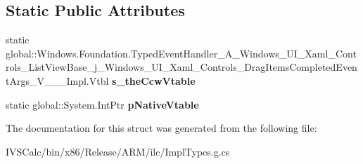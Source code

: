 \subsection*{Static Public Attributes}
\begin{DoxyCompactItemize}
\item 
\mbox{\label{struct_windows_1_1_foundation_1_1_typed_event_handler___a___windows___u_i___xaml___controls___li15051749ac89515b728f66d306810c20_a3a1b75c7479e81e1d65e9d9ffe09b704}} 
static global\+::\+Windows.\+Foundation.\+Typed\+Event\+Handler\+\_\+\+A\+\_\+\+Windows\+\_\+\+U\+I\+\_\+\+Xaml\+\_\+\+Controls\+\_\+\+List\+View\+Base\+\_\+j\+\_\+\+Windows\+\_\+\+U\+I\+\_\+\+Xaml\+\_\+\+Controls\+\_\+\+Drag\+Items\+Completed\+Event\+Args\+\_\+\+V\+\_\+\+\_\+\+\_\+\+Impl.\+Vtbl {\bfseries s\+\_\+the\+Ccw\+Vtable}
\item 
\mbox{\label{struct_windows_1_1_foundation_1_1_typed_event_handler___a___windows___u_i___xaml___controls___li15051749ac89515b728f66d306810c20_a93fe3a5a2e2391d1c3a4d0451387cc4a}} 
static global\+::\+System.\+Int\+Ptr {\bfseries p\+Native\+Vtable}
\end{DoxyCompactItemize}


The documentation for this struct was generated from the following file\+:\begin{DoxyCompactItemize}
\item 
I\+V\+S\+Calc/bin/x86/\+Release/\+A\+R\+M/ilc/Impl\+Types.\+g.\+cs\end{DoxyCompactItemize}

